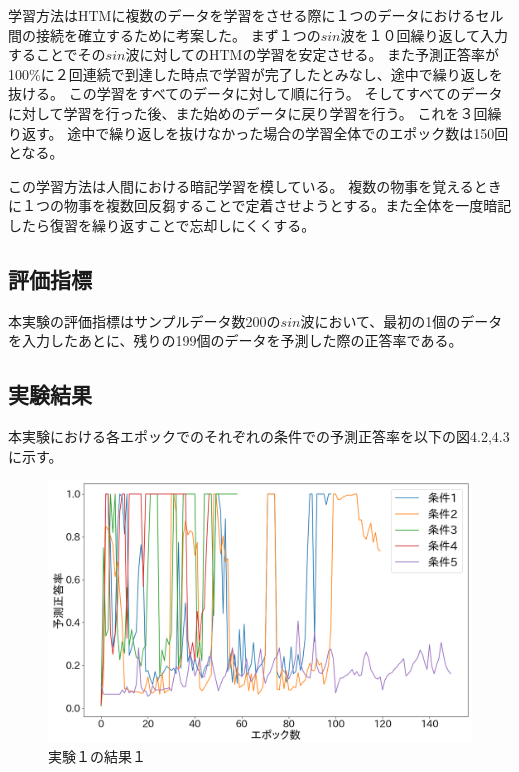 学習方法はHTMに複数のデータを学習をさせる際に１つのデータにおけるセル間の接続を確立するために考案した。
まず１つの$sin$波を１０回繰り返して入力することでその$sin$波に対してのHTMの学習を安定させる。
また予測正答率が100\%に２回連続で到達した時点で学習が完了したとみなし、途中で繰り返しを抜ける。
この学習をすべてのデータに対して順に行う。
そしてすべてのデータに対して学習を行った後、また始めのデータに戻り学習を行う。
これを３回繰り返す。
途中で繰り返しを抜けなかった場合の学習全体でのエポック数は150回となる。

この学習方法は人間における暗記学習を模している。
複数の物事を覚えるときに１つの物事を複数回反芻することで定着させようとする。また全体を一度暗記したら復習を繰り返すことで忘却しにくくする。

\subsection{評価指標}
本実験の評価指標はサンプルデータ数200の$sin$波において、最初の1個のデータを入力したあとに、残りの199個のデータを予測した際の正答率である。

\subsection{実験結果}
本実験における各エポックでのそれぞれの条件での予測正答率を以下の図4.2,4.3に示す。

\begin{figure}[ht]
  \begin{center}
    \includegraphics[width=12cm]{./fig/experiment1}
    \caption{実験１の結果１}
    \label{fig:experiment1-1}
  \end{center}
\end{figure}

